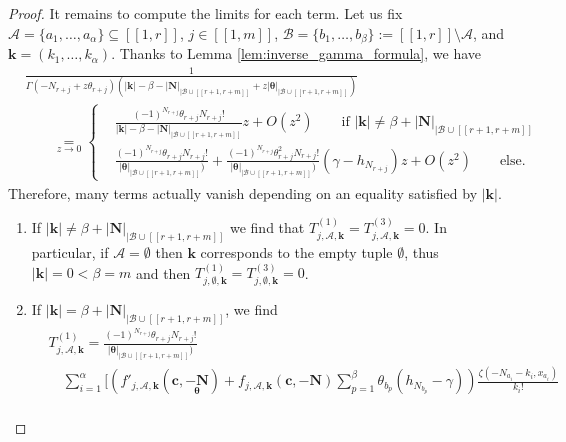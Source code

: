 \documentclass[a4paper]{amsart}
\theoremstyle{remark}
\theoremstyle{definition}
\begin{document}
\begin{proof}
It remains to compute the limits for each term. Let us fix $\mathcal{A} = \{ a_1,\ldots,a_{\alpha} \} \subseteq [\![ 1,r ]\!]$, $j \in [\![ 1,m ]\!]$, $\mathcal{B} = \{ b_1,\ldots,b_{\beta} \} := [\![ 1,r ]\!] \setminus \mathcal{A}$, and $\mathbf{k}=(k_1,\ldots,k_{\alpha})$. Thanks to Lemma \ref{lem:inverse_gamma_formula}, we have
\begin{align*}
    &\frac{1}{\Gamma(-N_{r+j}+z\theta_{r+j})(|\mathbf{k}|-\beta-|\mathbf{N}|_{|\mathcal{B}\cup [\![ r+1,r+m ]\!]}+z|\bm{\theta}|_{|\mathcal{B}\cup [\![ r+1,r+m ]\!]})} \\
    & \qquad \underset{z \to 0}{=}
    \begin{cases}
        &\frac{(-1)^{N_{r+j}}\theta_{r+j}N_{r+j}!}{|\mathbf{k}|-\beta-|\mathbf{N}|_{|\mathcal{B}\cup [\![ r+1,r+m ]\!]}}z+O(z^2) \qquad \text{if } |\mathbf{k}| \neq \beta+|\mathbf{N}|_{|\mathcal{B}\cup [\![ r+1,r+m ]\!]} \\
        &\frac{(-1)^{N_{r+j}}\theta_{r+j}N_{r+j}!}{|\bm{\theta}|_{|\mathcal{B}\cup [\![ r+1,r+m ]\!]})} + \frac{(-1)^{N_{r+j}}\theta_{r+j}^2N_{r+j}!}{|\bm{\theta}|_{|\mathcal{B}\cup [\![ r+1,r+m ]\!]})}\left(\gamma-h_{N_{r+j}} \right)z + O(z^2) \qquad \text{else.}
    \end{cases}
\end{align*}
Therefore, many terms actually vanish depending on an equality satisfied by $|\mathbf{k}|$.
\begin{enumerate}
\item[i)] If $|\mathbf{k}| \neq \beta+|\mathbf{N}|_{|\mathcal{B}\cup [\![ r+1,r+m ]\!]}$ we find that $T^{(1)}_{j,\mathcal{A},\mathbf{k}}=T^{(3)}_{j,\mathcal{A},\mathbf{k}}=0$. In particular, if $\mathcal{A}=\emptyset$ then $\mathbf{k}$ corresponds to the empty tuple $\emptyset$, thus $|\mathbf{k}|=0<\beta=m$ and then $T^{(1)}_{j,\emptyset,\mathbf{k}}=T^{(3)}_{j,\emptyset,\mathbf{k}}=0$.
\item[ii)] If $|\mathbf{k}| = \beta+|\mathbf{N}|_{|\mathcal{B}\cup [\![ r+1,r+m ]\!]}$, we find
\begin{align}
    &T^{(1)}_{j,\mathcal{A},\mathbf{k}}=\frac{(-1)^{N_{r+j}}\theta_{r+j}N_{r+j}!}{|\bm{\theta}|_{|\mathcal{B}\cup [\![ r+1,r+m ]\!]})} \label{eq:formula_T_1} \\
    & \quad \sum_{i=1}^{\alpha} \Biggl[ \left( f'_{j,\mathcal{A},\mathbf{k}}(\mathbf{c},\underset{\bm{\theta}}{-\mathbf{N}}) + f_{j,\mathcal{A},\mathbf{k}}(\mathbf{c},-\mathbf{N})\sum_{p=1}^{\beta} \theta_{b_{p}}(h_{N_{b_p}}-\gamma) \right) \frac{\zeta(-N_{a_i}-k_i,x_{a_i})}{k_{i}!} \nonumber \\

\end{align}
\end{enumerate}
\end{proof}
\end{document}
